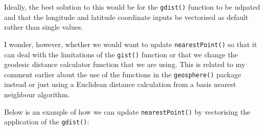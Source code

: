 \documentclass[11pt,a4paper]{article}
\begin{document}
Ideally, the best solution to this would be for the \texttt{gdist()}
function to be udpated and that the longitude and latitude coordinate
inputs be vectorised as default rather than single values.

I wonder, however, whether we would want to update
\texttt{nearestPoint()} so that it can deal with the limitations of the
\texttt{gist()} function or that we change the geodesic distance
calculator function that we are using. This is related to my comment
earlier about the use of the functions in the \texttt{geosphere()}
package instead or just using a Euclidean distance calculation from a
basis nearest neighbour algorithm.

Below is an example of how we can update \texttt{nearestPoint()} by
vectorising the application of the \texttt{gdist()}:

~
\end{document}
